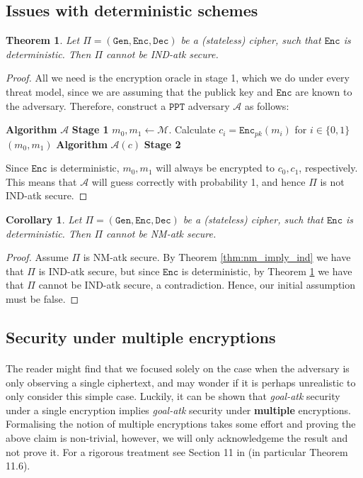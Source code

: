 \documentclass{article}
\newtheorem{theorem}{Theorem}[section]
\newtheorem{corollary}{Corollary}[theorem]
\theoremstyle{definition}
\newcommand{\Enc}{\texttt{Enc}}
\newcommand{\Dec}{\texttt{Dec}}
\newcommand{\Gen}{\texttt{Gen}}
\newcommand{\M}{\mathcal{M}}
\newcommand{\A}{\mathcal{A}}
\newcommand{\PPT}{\texttt{PPT}}
\begin{document}
\subsection{Issues with deterministic schemes}
\begin{theorem}
  \label{thm:determ_enc_insecure}
  Let $\Pi = (\Gen, \Enc, \Dec)$ be a (stateless) cipher, such that $\Enc$ is deterministic.
  Then $\Pi$ cannot be IND-atk secure.
\end{theorem}
\begin{proof}
  All we need is the encryption oracle in stage 1, which we do under every
  threat model, since we are assuming that the publick key and $\Enc$ are known
  to the adversary. Therefore, construct a $\PPT$ adversary $\A$ as follows:
  \begin{algorithmic}
    \State \textbf{Algorithm} $\A$ \textbf{Stage 1}
    \State $m_0, m_1 \leftarrow \M$.
    \State Calculate $c_i = \Enc_{pk}(m_i)$ for $i \in \{0, 1\}$
    \State \Return $(m_0, m_1)$
    \State
    \State \textbf{Algorithm} $\A(c)$ \textbf{Stage 2}
     \EndIf
    \State
  \end{algorithmic}
  Since $\Enc$ is deterministic, $m_0, m_1$ will always be encrypted to $c_0,
  c_1$, respectively. This means that $\A$ will guess correctly with probability 1,
  and hence $\Pi$ is not IND-atk secure.
\end{proof}
\begin{corollary}
  \label{cor:determ_nm_insecure}
  Let $\Pi = (\Gen, \Enc, \Dec)$ be a (stateless) cipher, such that $\Enc$ is deterministic.
  Then $\Pi$ cannot be NM-atk secure.
\end{corollary}
\begin{proof}
  Assume $\Pi$ is NM-atk secure. By Theorem \ref{thm:nm_imply_ind} we have that
  $\Pi$ is IND-atk secure, but since $\Enc$ is deterministic, by Theorem \ref{thm:determ_enc_insecure} we have
  that $\Pi$ cannot be IND-atk secure, a contradiction. Hence, our initial
  assumption must be false.
\end{proof}
\subsection{Security under multiple encryptions}
\paragraph{} The reader might find that we focused solely on the case when the
adversary is only observing a single ciphertext, and may wonder if it is perhaps
unrealistic to only consider this simple case. Luckily, it can be shown that \textit{goal-atk}
security under a single encryption implies \textit{goal-atk} security under
\textbf{multiple} encryptions. Formalising the notion of multiple encryptions
takes some effort and proving the above claim is non-trivial, however, we will
only acknowledgeme the result and not prove it. For a rigorous treatment see
Section 11 in \cite{katz2014introduction} (in particular Theorem 11.6).
\end{document}
